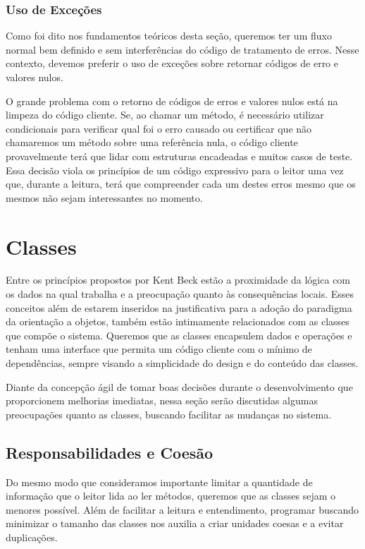 \subsubsection{Uso de Exceções}
Como foi dito nos fundamentos teóricos desta seção, queremos ter um fluxo normal bem definido e sem interferências do código de tratamento de erros. Nesse contexto, devemos preferir o uso de exceções sobre retornar códigos de erro e valores nulos.
	
O grande problema com o retorno de códigos de erros e valores nulos está na limpeza do código cliente. Se, ao chamar um método, é necessário utilizar condicionais para verificar qual foi o erro causado ou certificar que não chamaremos um método sobre uma referência nula, o código cliente provavelmente terá que lidar com estruturas encadeadas e muitos casos de teste. Essa decisão viola os princípios de um código expressivo para o leitor uma vez que, durante a leitura, terá que compreender cada um destes erros mesmo que os mesmos não sejam interessantes no momento.

\section{Classes}
\label{sec:classes}

Entre os princípios propostos por Kent Beck estão a proximidade da lógica com os dados na qual trabalha e a preocupação quanto às consequências locais. Esses conceitos além de estarem inseridos na justificativa para a adoção do paradigma da orientação a objetos, também estão intimamente relacionados com as classes que compõe o sistema. Queremos que as classes encapsulem dados e operações e tenham uma interface que permita um código cliente com o mínimo de dependências, sempre visando a simplicidade do design e do conteúdo das classes.
	
Diante da concepção ágil de tomar boas decisões durante o desenvolvimento que proporcionem melhorias imediatas, nessa seção serão discutidas algumas preocupações quanto as classes, buscando facilitar as mudanças no sistema.

\subsection{Responsabilidades e Coesão}
Do mesmo modo que consideramos importante limitar a quantidade de informação que o leitor lida ao ler métodos, queremos que as classes sejam o menores possível. Além de facilitar a leitura e entendimento, programar buscando minimizar o tamanho das classes nos auxilia a criar unidades coesas e a evitar duplicações. 
	
